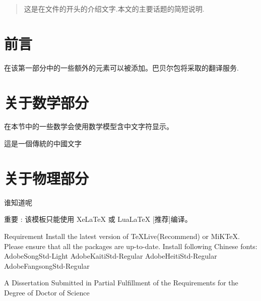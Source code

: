 




\tableofcontents

\begin{abstract}
这是在文件的开头的介绍文字.本文的主要话题的简短说明.
\end{abstract}

\section{前言}
在该第一部分中的一些额外的元素可以被添加。巴贝尔包将采取的翻译服务.

\section{关于数学部分}
在本节中的一些数学会使用数学模型含中文字符显示。

這是一個傳統的中國文字

\section{关于物理部分}
谁知道呢



重要 : 该模板只能使用 XeLaTeX 或 LuaLaTeX [推荐]编译。


Requirement
Install the latest version of TeXLive(Recommend) or MiKTeX. Please ensure that all the packages are up-to-date.
Install following Chinese fonts:
AdobeSongStd-Light
AdobeKaitiStd-Regular
AdobeHeitiStd-Regular
AdobeFangsongStd-Regular


A Dissertation Submitted in Partial Fulfillment of the Requirements
for the Degree of Doctor of Science
